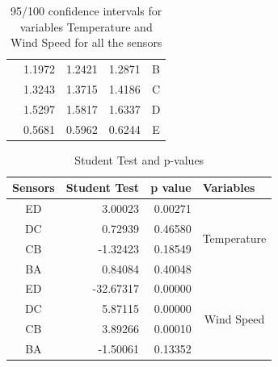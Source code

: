 \documentclass[a4paper,12pt]{article}
\begin{document}
\begin{table}[]
\begin{tabular}{|l|r|r|r|c|}
		& 1.1972                   & 1.2421                 & 1.2871                   & B                                             \\ \cline{2-5} 
		& 1.3243                   & 1.3715                 & 1.4186                   & C                                             \\ \cline{2-5} 
		& 1.5297                   & 1.5817                 & 1.6337                   & D                                             \\ \cline{2-5} 
		& 0.5681                   & 0.5962                 & 0.6244                   & E                                             \\ \hline
	\end{tabular}
	\caption{95/100 confidence intervals for variables Temperature and Wind Speed for all the sensors \cite{Maiullari2020}}
 \end{table}
 \begin{table}[]
	\centering
	\begin{tabular}{|c|r|r|c|}
		\hline
		\multicolumn{1}{|l|}{Sensors} & \multicolumn{1}{l|}{Student Test} & \multicolumn{1}{l|}{p value} & \multicolumn{1}{l|}{Variables} \\ \hline
		ED                            & 3.00023                           & 0.00271                      & \multirow{4}{*}{Temperature}   \\ \cline{1-3}
		DC                            & 0.72939                           & 0.46580                      &                                \\ \cline{1-3}
		CB                            & -1.32423                          & 0.18549                      &                                \\ \cline{1-3}
		BA                            & 0.84084                           & 0.40048                      &                                \\ \hline
		ED                            & -32.67317                         & 0.00000                      & \multirow{4}{*}{Wind Speed}    \\ \cline{1-3}
		DC                            & 5.87115                           & 0.00000                      &                                \\ \cline{1-3}
		CB                            & 3.89266                           & 0.00010                      &                                \\ \cline{1-3}
		BA                            & -1.50061                          & 0.13352                      &                                \\ \hline
	\end{tabular}
	\caption{Student Test and p-values}
 \end{table}
\pagebreak
\end{document}
